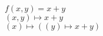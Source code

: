 \documentclass[varwidth,convert={density=2000,size=2000x,outext=.png}]{standalone}
\begin{document}
$f(x,y)=x+y$
\\
$(x,y)\mapsto x+y$
\\
$(x)\mapsto((y)\mapsto x+y)$
\\
\end{document}

